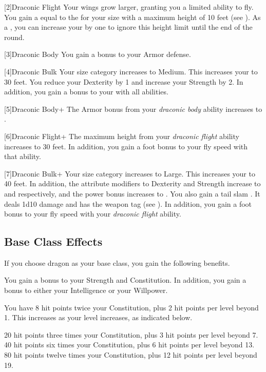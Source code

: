      [2]{Draconic Flight} Your wings grow larger, granting you a limited ability to fly.
      You gain a  equal to the  for your size with a maximum height of 10 feet (see ).
      As a , you can increase your  by one to ignore this height limit until the end of the round.

    [3]{Draconic Body} You gain a  bonus to your Armor defense.

    [4]{Draconic Bulk} Your size category increases to Medium.
      This increases your  to 30 feet.
      You reduce your Dexterity by 1 and increase your Strength by 2.
      In addition, you gain a  bonus to your  with all abilities.

    [5]{Draconic Body+} The Armor bonus from your \textit{draconic body} ability increases to .

      [6]{Draconic Flight+} The maximum height from your \textit{draconic flight} ability increases to 30 feet.
      In addition, you gain a  foot bonus to your fly speed with that ability.

    [7]{Draconic Bulk+} Your size category increases to Large.
      This increases your  to 40 feet.
      In addition, the attribute modifiers to Dexterity and Strength increase to  and  respectively, and the power bonus increases to .
      You also gain a tail slam .
      It deals 1d10 damage and has the  weapon tag (see ).
      In addition, you gain a  foot bonus to your fly speed with your \textit{draconic flight} ability.

  \subsection{Base Class Effects}
    If you choose dragon as your base class, you gain the following benefits.

     You gain a  bonus to your Strength and Constitution. In addition, you gain a  bonus to either your Intelligence or your Willpower.

      You have 8 hit points \add twice your Constitution, plus 2 hit points per level beyond 1.
      This increases as your level increases, as indicated below.
      \begin{itemize}
         20 hit points \add three times your Constitution, plus 3 hit points per level beyond 7.
         40 hit points \add six times your Constitution, plus 6 hit points per level beyond 13.
         80 hit points \add twelve times your Constitution, plus 12 hit points per level beyond 19.
      \end{itemize}

